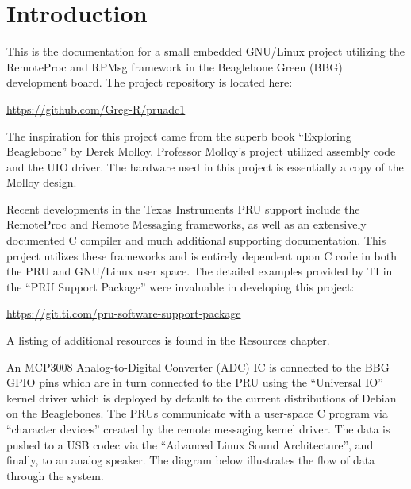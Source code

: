 %
%
%

\chapter{Introduction}

This is the documentation for a small embedded GNU/Linux project utilizing the RemoteProc and RPMsg framework in the Beaglebone Green (BBG) development board.  The project repository is located here:

\url{https://github.com/Greg-R/pruadc1}

The inspiration for this project came from the superb book ``Exploring Beaglebone'' by Derek Molloy.  Professor Molloy's project utilized assembly code and the UIO driver.  The hardware used in this project is essentially a copy of the Molloy design.

Recent developments in the Texas Instruments PRU support include the RemoteProc and Remote Messaging frameworks, as well as an extensively documented C compiler and much additional supporting documentation.  This project utilizes these frameworks and is entirely dependent upon C code in both the PRU and GNU/Linux user space.  The detailed examples provided by TI in the ``PRU Support Package'' were invaluable in developing this project:

\url{https://git.ti.com/pru-software-support-package}

A listing of additional resources is found in the Resources chapter.

An MCP3008 Analog-to-Digital Converter (ADC) IC is connected to the BBG GPIO pins which are in turn connected to the PRU using the ``Universal IO'' kernel driver which is deployed by default to the current distributions of Debian on the Beaglebones.  The PRUs communicate with a user-space C program via ``character devices'' created by the remote messaging kernel driver.  The data is pushed to a USB codec via the ``Advanced Linux Sound Architecture'', and finally, to an analog speaker.  The diagram below illustrates the flow of data through the system.


